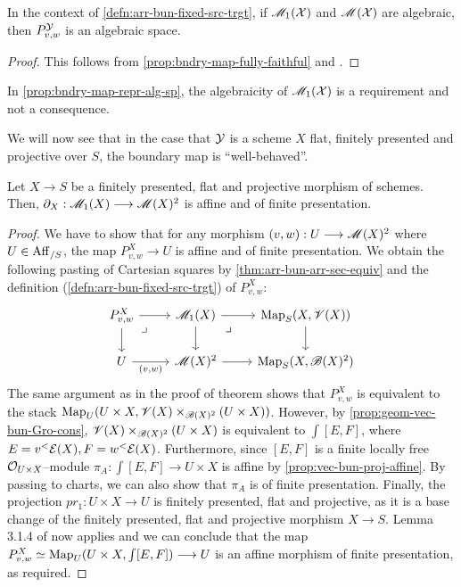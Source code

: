 \documentclass[11pt]{amsart}
\begin{document}
\begin{prop}\label{prop:bndry-map-repr-alg-sp}
In the context of \cref{defn:arr-bun-fixed-src-trgt}, if
$\mathscr{M}_1(\mathcal{X})$ and $\mathscr{M}(\mathcal{X})$ are algebraic, then $P^\mathcal{Y}_{v, w}$
is an algebraic space.
\end{prop}
\begin{proof}
This follows from \cref{prop:bndry-map-fully-faithful} and
\cite[\href{https://stacks.math.columbia.edu/tag/04Y5}{Lemma 04Y5}]
{stacks-project}.
\end{proof}

\begin{warn}
In \cref{prop:bndry-map-repr-alg-sp}, the algebraicity of $\mathscr{M}_1(\mathcal{X})$
is a requirement and not a consequence.
\end{warn}

We will now see that in the case that $\mathcal{Y}$ is a scheme $X$ flat, finitely
presented and projective over $S$, the boundary map is ``well-behaved''.

\begin{thm}\label{thm:X-fppf-proj-bndry-map-aff-fp}
Let $X \to S$ be a finitely presented, flat and projective morphism of schemes.
Then, $\partial_X : \sM_1(X) \to \sM(X)^2$ is affine and of finite presentation.
\end{thm}
\begin{proof}
We have to show that for any morphism $(v, w) : U \to \sM(X)^2$ where
$U \in \mathrm{Aff}_{/S}$, the map $P^X_{v, w} \to U$ is affine and of finite
presentation.
We obtain the following pasting of Cartesian squares by
\cref{thm:arr-bun-arr-sec-equiv} and the definition
(\ref{defn:arr-bun-fixed-src-trgt}) of $P^X_{v, w}$:
\[\begin{tikzcd}
P^X_{v, w} \ar[r] \ar[d] \ar[rd, phantom, "\lrcorner" very near start] &
\sM_1(X) \ar[r] \ar[d] \ar[rd, phantom, "\lrcorner" very near start] &
\Map_S(X, \sV(X)) \ar[d] \\
U \ar[r, "{(v, w)}" below] &
\sM(X)^2 \ar[r] &
\Map_S(X, \sB(X)^2)
\end{tikzcd}\]
The same argument as in the proof of theorem \cite[Lemma 3.2.1]{Wang-BunG}
shows that $P^X_{v, w}$ is equivalent to the stack
$\mathrm{Map}_U(U \times X, \mathscr{V}(X) \times_{\mathscr{B}(X)^2} (U \times X))$. However,
by \cref{prop:geom-vec-bun-Gro-cons}, $\mathscr{V}(X) \times_{\mathscr{B}(X)^2} (U \times X)$
is equivalent to $\int [E, F]$, where $E = v^<\mathcal{E}(X), F = w^<\mathcal{E}(X)$.
Furthermore, since $[E, F]$ is a finite locally free $\mathcal{O}_{U \times X}$--module
$\pi_A : \int [E, F] \to U \times X$ is affine by
\cref{prop:vec-bun-proj-affine}. By passing to charts, we can also show that
$\pi_A$ is of finite presentation. Finally, the projection
$pr_1 : U \times X \to U$ is finitely presented, flat and projective,
as it is a base change of the finitely presented, flat and projective morphism
$X \to S$. Lemma 3.1.4 of \cite{Wang-BunG} now applies and we can conclude that
the map $P^X_{v, w} \simeq \Map_U(U \times X, \int [E, F]) \to U$ is an affine
morphism of finite presentation, as required.
\end{proof}
\end{document}
